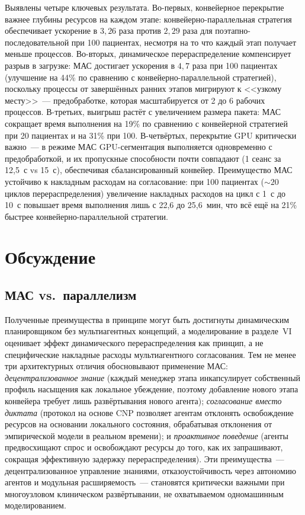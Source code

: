 \documentclass[conference]{IEEEtran}
\begin{document}
Выявлены четыре ключевых результата. Во-первых, конвейерное перекрытие важнее глубины ресурсов на каждом этапе: конвейерно-параллельная стратегия обеспечивает ускорение в $3{,}26$ раза против $2{,}29$ раза для поэтапно-последовательной при 100 пациентах, несмотря на то что каждый этап получает меньше процессов. Во-вторых, динамическое перераспределение компенсирует разрыв в загрузке: МАС достигает ускорения в $4{,}7$ раза при 100 пациентах (улучшение на 44\% по сравнению с конвейерно-параллельной стратегией), поскольку процессы от завершённых ранних этапов мигрируют к <<узкому месту>>~--- предобработке, которая масштабируется от 2 до 6 рабочих процессов. В-третьих, выигрыш растёт с увеличением размера пакета: МАС сокращает время выполнения на 19\% по сравнению с конвейерной стратегией при 20 пациентах и на 31\% при 100. В-четвёртых, перекрытие GPU критически важно~--- в режиме МАС GPU-сегментация выполняется одновременно с предобработкой, и их пропускные способности почти совпадают (1 сеанс за 12,5~с vs 15~с), обеспечивая сбалансированный конвейер. Преимущество МАС устойчиво к накладным расходам на согласование: при 100 пациентах (${\sim}20$ циклов перераспределения) увеличение накладных расходов на цикл с 1~с до 10~с повышает время выполнения лишь с 22,6 до 25,6~мин, что всё ещё на 21\% быстрее конвейерно-параллельной стратегии.

\section{Обсуждение}

\subsection{МАС vs.\ параллелизм}

Полученные преимущества в принципе могут быть достигнуты динамическим планировщиком без мультиагентных концепций, а моделирование в разделе~VI оценивает эффект динамического перераспределения как принцип, а не специфические накладные расходы мультиагентного согласования. Тем не менее три архитектурных отличия обосновывают применение МАС: \textit{децентрализованное знание} (каждый менеджер этапа инкапсулирует собственный профиль насыщения как локальное убеждение, поэтому добавление нового этапа конвейера требует лишь развёртывания нового агента); \textit{согласование вместо диктата} (протокол на основе CNP позволяет агентам отклонять освобождение ресурсов на основании локального состояния, обрабатывая отклонения от эмпирической модели в реальном времени); и \textit{проактивное поведение} (агенты предвосхищают спрос и освобождают ресурсы до того, как их запрашивают, сокращая эффективную задержку перераспределения). Эти преимущества~--- децентрализованное управление знаниями, отказоустойчивость через автономию агентов и модульная расширяемость~--- становятся критически важными при многоузловом клиническом развёртывании, не охватываемом одномашинным моделированием.
\end{document}
